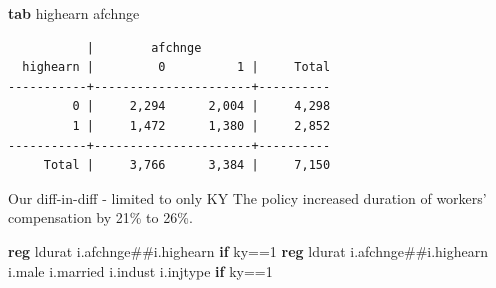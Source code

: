 \documentclass[
]{book}
\newenvironment{Shaded}{\begin{snugshade}}{\end{snugshade}}
\newcommand{\KeywordTok}[1]{\textcolor[rgb]{0.13,0.29,0.53}{\textbf{#1}}}
\newcommand{\NormalTok}[1]{#1}
\begin{document}
\begin{Shaded}
\begin{Highlighting}[]
\KeywordTok{tab}\NormalTok{ highearn afchnge}
\end{Highlighting}
\end{Shaded}

\begin{verbatim}
           |        afchnge
  highearn |         0          1 |     Total
-----------+----------------------+----------
         0 |     2,294      2,004 |     4,298 
         1 |     1,472      1,380 |     2,852 
-----------+----------------------+----------
     Total |     3,766      3,384 |     7,150 
\end{verbatim}

Our diff-in-diff - limited to only KY
The policy increased duration of workers' compensation by 21\% to 26\%.

\begin{Shaded}
\begin{Highlighting}[]
\KeywordTok{reg}\NormalTok{ ldurat i.afchnge\#\#i.highearn }\KeywordTok{if}\NormalTok{ ky==1}
\KeywordTok{reg}\NormalTok{ ldurat i.afchnge\#\#i.highearn i.male i.married i.indust i.injtype }\KeywordTok{if}\NormalTok{ ky==1}
\end{Highlighting}
\end{Shaded}
\end{document}
